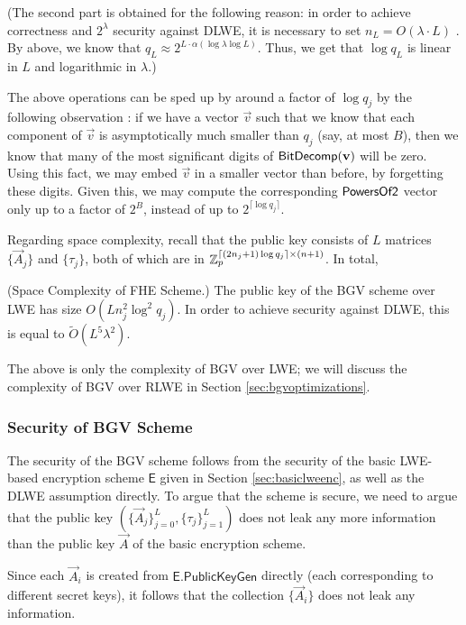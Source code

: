        (The second part is obtained for the following reason: in order to achieve correctness and $2^\lambda$ security against DLWE, it is necessary to set $n_L = O(\lambda \cdot L)$ \cite{bgv2011}. By above, we know that $q_L \approx 2^{L \cdot \alpha (\log \lambda \log L)}$. Thus, we get that $\log q_L$ is linear in $L$ and logarithmic in $\lambda$.)



        The above operations can be sped up by around a factor of $\log q_j$ by the following observation \cite{bgv2011}: if we have a vector $\vec{v}$ such that we know that each component of $\vec{v}$ is asymptotically much smaller than $q_j$ (say, at most $B$), then we know that many of the most significant digits of ${\sf BitDecomp}(\vec{v})$ will be zero. Using this fact, we may embed $\vec{v}$ in a smaller vector than before, by forgetting these digits. Given this, we may compute the corresponding ${\sf PowersOf2}$ vector only up to a factor of $2^B$, instead of up to $2^{\lceil \log q_j \rceil}$.

        Regarding space complexity, recall that the public key consists of $L$ matrices $\{\vec{A}_j\}$ and $\{\tau_j\}$, both of which are in $\Z_p^{\lceil (2n_j + 1) \log q_j \rceil \times (n+1)}$. In total,
        \begin{lemma} (Space Complexity of FHE Scheme.)
            The public key of the BGV scheme over LWE has size $O(L n_j^2 \log^2 q_j)$. In order to achieve security against DLWE, this is equal to $\widetilde{O}(L^5 \lambda^2)$.
        \end{lemma}

        The above is only the complexity of BGV over LWE; we will discuss the complexity of BGV over RLWE in Section \ref{sec:bgvoptimizations}.


    \subsubsection{Security of BGV Scheme}
    The security of the BGV scheme follows from the security of the basic LWE-based encryption scheme $\textsf{E}$ given in Section \ref{sec:basiclweenc}, as well as the DLWE assumption directly. To argue that the scheme is secure, we need to argue that the public key $(\{\vec{A}_j\}_{j = 0}^L, \{\tau_j\}_{j = 1}^L)$ does not leak any more information than the public key $\vec{A}$ of the basic encryption scheme.

    Since each $\vec{A}_i$ is created from $\textsf{E.PublicKeyGen}$ directly (each corresponding to different secret keys), it follows that the collection $\{\vec{A}_i\}$ does not leak any information.

